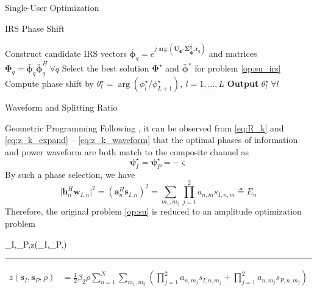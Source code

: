 \documentclass{IEEEtran}
\begin{document}
\begin{section}{Single-User Optimization}
\begin{subsection}{IRS Phase Shift}
\begin{algorithm}
\begin{algorithmic}[1]
				\State Construct candidate IRS vectors $\bar{\boldsymbol{\phi}}_q=e^{j\arg\left(\boldsymbol{U}_{\boldsymbol{\Phi}^{\star}}\boldsymbol{\Sigma}_{\boldsymbol{\Phi}^{\star}}^{\frac{1}{2}}\boldsymbol{r}_q\right)}$ and matrices $\boldsymbol{\Phi}_q=\bar{\boldsymbol{\phi}}_q\bar{\boldsymbol{\phi}}_q^H  \ \forall q$
				\State Select the best solution $\boldsymbol{\Phi}^\star$ and $\bar{\boldsymbol{\phi}}^\star$ for problem \ref{op:su_irs}
				\State Compute phase shift by $\theta_l^\star=\arg(\phi_l^\star/\phi_{L+1}^\star), \ l=1,\dots,L$
				\State \textbf{Output} $\theta_l^\star \ \forall l$
			\end{algorithmic}
		\end{algorithm}
	\end{subsection}

	\begin{subsection}{Waveform and Splitting Ratio}
		\begin{subsubsection}{Geometric Programming}
			Following \cite{Clerckx2018b}, it can be observed from \ref{eq:R_k} and \ref{eq:z_k_expand} -- \ref{eq:z_k_waveform} that the optimal phases of information and power waveform are both match to the composite channel as
			\begin{equation}\label{eq:psi}
				\boldsymbol{\psi}_{I}^{\star}=\boldsymbol{\psi}_{P}^{\star}=-\boldsymbol{\varsigma}
			\end{equation}
			By such a phase selection, we have
			\begin{equation}
				\lvert{\boldsymbol{h}_n^H\boldsymbol{w}_{I,n}}\rvert^2=(\boldsymbol{a}_n^H\boldsymbol{s}_{I,n})^2=\sum_{m_1,m_2}\prod_{j=1}^2{a_{n,m}s_{I,n,m}} \triangleq E_n
			\end{equation}
			Therefore, the original problem \ref{op:su} is reduced to an amplitude optimization problem
			\begin{maxi!}
					{\boldsymbol{s}_I,_P,\rho}{z(_I,_P,\rho)}{\label{op:su_gp}}{}
				\end{maxi!}
			\begin{figure*}[b]
				\hrule
				\begin{equation}\label{eq:z_gp}
					\begin{split}
						z(\boldsymbol{s}_I,\boldsymbol{s}_P,\rho)
						& = \frac{1}{2}{\beta_2}{\rho} \sum_{n=1}^N \sum_{m_1,m_2} \left( \prod_{j=1}^2 {a_{n,m_j}s_{I,n,m_j}} + \prod_{j=1}^2 {a_{n,m_j}s_{P,n,m_j}} \right)\\

\end{split}
\end{equation}
\end{figure*}
\end{subsubsection}
\end{subsection}
\end{section}
\end{document}
